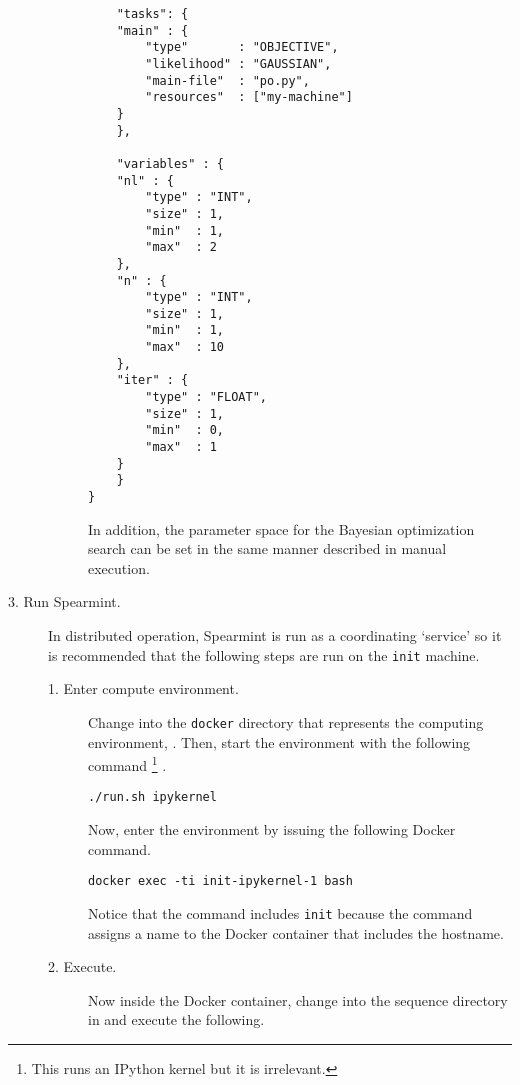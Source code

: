 \begin{description}
\begin{description}
\begin{verbatim}
    "tasks": {
	"main" : {
	    "type"       : "OBJECTIVE",
	    "likelihood" : "GAUSSIAN",
	    "main-file"  : "po.py",
	    "resources"  : ["my-machine"]
	}
    },
    
    "variables" : {
	"nl" : {
	    "type" : "INT",
	    "size" : 1,
	    "min"  : 1,
	    "max"  : 2
	},
	"n" : {
	    "type" : "INT",
	    "size" : 1,
	    "min"  : 1,
	    "max"  : 10
	},
	"iter" : {
	    "type" : "FLOAT",
	    "size" : 1,
	    "min"  : 0,
	    "max"  : 1
	}
    }
}
\end{verbatim}

    In addition, the parameter space for the Bayesian optimization search can be set in the same manner described in manual execution.
  

\end{description}

\item[3. Run Spearmint.] \hfill

  In distributed operation, \textsf{Spearmint} is run as a coordinating `service' so it is recommended that the following steps are run on the \texttt{init} machine.
 
\begin{description}


\item[1. Enter compute environment.] \hfill

  Change into the \texttt{docker} directory that represents the computing environment, .
  Then, start the environment with the following command%
  \footnote{This runs an \textsf{IPython} kernel but it is irrelevant.}%
  .

\begin{verbatim}
./run.sh ipykernel
\end{verbatim}
%
Now, enter the environment by issuing the following \textsf{Docker} command.

%
\begin{verbatim}
docker exec -ti init-ipykernel-1 bash
\end{verbatim}
%
Notice that the command includes \texttt{init} because the  command assigns a name to the \textsf{Docker} container that includes the hostname.


\item[2. Execute.] \hfill

  Now inside the \textsf{Docker} container, change into the sequence directory in  and execute the following.


\end{description}
\end{description}
